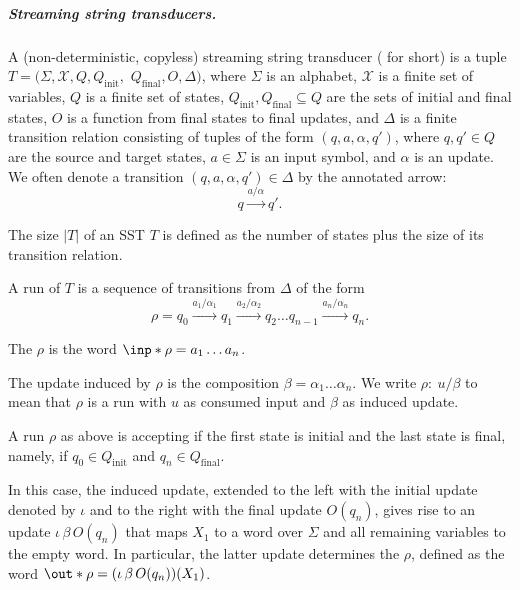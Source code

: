 \documentclass{article}
\providecommand{\AP}{}\NewDocumentCommand{\reintro}{o m}{#2}
\newcommand{\aut}{A}
\newcommand{\sst}{T}
\newcommand{\var}{\mathcal{X}}
\newcommand{\alp}{\Sigma}
\newcommand{\sub}[2]{{\mathcal S}_{#1,#2}}
\newcommand{\finalupd}{O}
\begin{document}
\medskip
\subparagraph{\bf Streaming string transducers.}
A (non-deterministic, copyless) 
streaming string transducer
( for short) 
is a tuple 
$T = (\alp, \var, Q, Q_{\mathrm{init}},$  $Q_{\mathrm{final}}, \finalupd, \Delta)$,
where $\alp$ is an alphabet, $\var$ is a finite set of variables, $Q$ is a finite set of states, 
$Q_{\mathrm{init}}, Q_{\mathrm{final}} \subseteq Q$ are the sets of 
initial and final states, $\finalupd$ is a function from final states
to final updates, and
$\Delta$ is a finite transition relation consisting of tuples of the form 
$(q, a, \alpha, q')$, where $q,q'\in Q$ are the source and target states, 
$a\in\alp$ is an input symbol, and $\alpha$ is an update.
We often denote a transition $(q, a, \alpha, q')\in\Delta$ by the 
annotated arrow:
\[q \xrightarrow{a/\alpha} q'.\]
\AP
The size $|T|$ of an SST $T$ is defined as the number 
of states plus the size of its transition relation.


\AP
A run of $\sst$ 
is a sequence of transitions from $\Delta$ of the form
\[
\rho = q_0 \xrightarrow{a_1/\alpha_1} q_1 \xrightarrow{a_2/\alpha_2} q_2 \dots
q_{n-1} \xrightarrow{a_n/\alpha_n} q_n.
\]
\AP
The  $\rho$ is the word
$\inp*{\rho} = a_1\dots a_n$.
\AP
The update induced by $\rho$ is the composition $\beta = \alpha_1 \dots \alpha_n$.
We write $\rho:\: u/\beta$ 
to mean that $\rho$ is a run with $u$ as
consumed input and $\beta$ as induced update.
\AP
A run $\rho$ as above is accepting if
the first state is initial and the last state is final,
namely, if $q_0\in Q_{\mathrm{init}}$ and $q_n\in Q_{\mathrm{final}}$. 
\AP
In this case, the induced update, extended to the left
with the initial update denoted by $\iota$ and to the right with
the final update $\finalupd(q_n)$, gives rise to an
update $\iota \, \beta \, \finalupd(q_n)$ that maps $X_1$ to a word 
over $\alp$ and all remaining variables to the empty word.
In particular, the latter update determines the 
 $\rho$,
defined as the word 
$\out*{\rho} = (\iota \, \beta \, \finalupd(q_n))(X_1)$.
\end{document}
